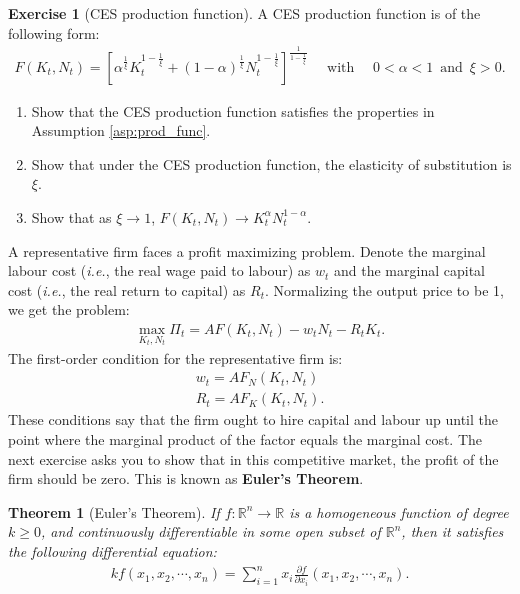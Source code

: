 \documentclass{book}
\newtheorem{theorem}{Theorem}[chapter]
\theoremstyle{definition}
\newtheorem{exercise}{Exercise}[chapter]
\theoremstyle{plain}
\begin{document}
\begin{exercise}[CES production function]
    A CES production function is of the following form:
    \begin{align}\label{eq:ces_prod_func}
        F(K_t, N_t) = \left[\alpha^{\frac{1}{\xi}} K_t^{1-\frac{1}{\xi}} + (1-\alpha)^{\frac{1}{\xi}} N_t^{1-\frac{1}{\xi}}\right]^{\frac{1}{1-\frac{1}{\xi}}} \quad \text{ with } \quad 0 < \alpha < 1 \, \text{ and } \, \xi > 0.
    \end{align}
    \begin{enumerate}[label=(\arabic*)]
        \item Show that the CES production function satisfies the properties in Assumption \ref{asp:prod_func}.
        \item Show that under the CES production function, the elasticity of substitution is $\xi$.
        \item Show that as $\xi \to 1$, $F(K_t, N_t) \to K_t^{\alpha} N_t^{1-\alpha}$.
    \end{enumerate}
\end{exercise}

A representative firm faces a profit maximizing problem. Denote the marginal labour cost (\textit{i.e.}, the real wage paid to labour) as $w_t$ and the marginal capital cost (\textit{i.e.}, the real return to capital) as $R_t$. Normalizing the output price to be 1, we get the problem:
\begin{align} \label{eq:firm_opt_problem}
    \max_{K_t, N_t} \Pi_t = A F(K_t, N_t) - w_t N_t - R_t K_t.
\end{align}
The first-order condition for the representative firm is:
\begin{align} 
    w_t = A F_N(K_t, N_t) \label{eq:real_wage} \\
    R_t = A F_K(K_t, N_t) \label{eq:capital_return}.
\end{align}
These conditions say that the firm ought to hire capital and labour up until the point where the marginal product of the factor equals the marginal cost. The next exercise asks you to show that in this competitive market, the profit of the firm should be zero. This is known as \textbf{Euler's Theorem}.

\begin{theorem}[Euler's Theorem]\label{thm:euler_theorem}
    If $f: \mathbb{R}^n \to \mathbb{R}$ is a homogeneous function of degree $k\geq 0$, and continuously differentiable in some open subset of $\mathbb{R}^n$, then it satisfies the following differential equation:
    \begin{align}\label{eq:euler_theorem}
        k f(x_1, x_2, \cdots, x_n) = \sum_{i=1}^n x_i \frac{\partial f}{\partial x_i}(x_1, x_2, \cdots, x_n).
    \end{align}
\end{theorem}
\end{document}

